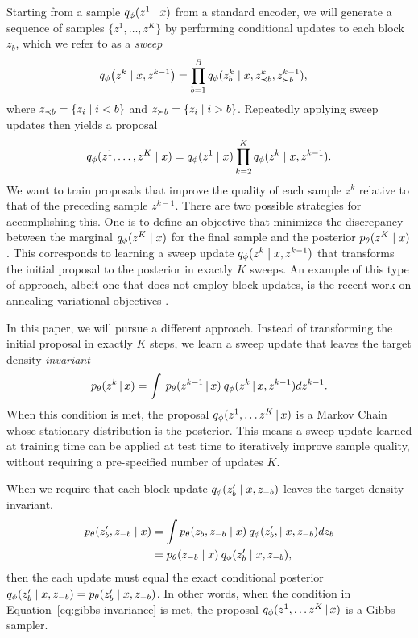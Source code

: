 \documentclass{article}
\theoremstyle{definition}
\begin{document}
Starting from a sample $q_\phi(z^{1} \mid x)$ from a standard encoder, we will generate a sequence of samples $\{z^1, \ldots, z^K\}$ by performing conditional updates to each block $z_b$, which we refer to as a \emph{sweep}
\begin{align}
    \label{eq:approx-gibbs-kernel}
    q_\phi \big( z^k \mid x, z^{k-1} \big)
    &=
    \prod_{b=1}^B
    q_\phi(z^k_b \mid x, z^{k}_{\prec b}, z^{k-1}_{\succ b})
    ,
\end{align}
where $z_{\prec b} = \{z_i \mid i < b\}$ and $z_{\succ b} = \{z_i \mid i > b\}$. Repeatedly applying sweep updates then yields a proposal
\begin{equation*}
    q_\phi(z^1, \ldots, z^K \mid x) 
    =
    q_\phi(z^1 \mid x)
    \prod_{k=2}^K
    q_\phi(z^k \mid x, z^{k-1}).
\end{equation*}
We want to train proposals that improve the quality of each sample $z^k$ relative to that of the preceding sample $z^{k-1}$. There are two possible strategies for accomplishing this. One is to define an objective that minimizes the discrepancy between the marginal $q_\phi(z^K \mid x)$ for the final sample and the posterior $p_\theta(z^K \mid x)$. This corresponds to learning a sweep update $q_\phi(z^k \mid x, z^{k-1})$ that transforms the initial proposal to the posterior in exactly $K$ sweeps. An example of this type of approach, albeit one that does not employ block updates, is the recent work on annealing variational objectives \cite{huang2018improving}.

In this paper, we will pursue a different approach. Instead of transforming the initial proposal in exactly $K$ steps, we learn a sweep update that leaves the target density \emph{invariant}
\begin{equation}
    \label{eq:kernel-invariance}
    p_\theta(z^k \,|\, x) = \int \: p_\theta(z^{k-1} \,|\, x) \: q_\phi(z^k \,|\,x, z^{k-1}) d z^{k-1}.
\end{equation}
When this condition is met, the proposal $q_\phi(z^1, \ldots z^K \,|\, x)$ is a Markov Chain whose stationary distribution is the posterior. 
This means a sweep update learned at training time can be applied at test time to iteratively improve sample quality, without requiring a pre-specified number of updates $K$.

When we require that each block update $q_\phi(z'_b \mid x, z_{-b})$ leaves the target density invariant, 
\begin{align}
    \label{eq:gibbs-invariance}
    p_\theta(z'_b, z_{-b} \mid x)
    &= 
    \int 
    p_\theta(z_b, z_{-b} \mid x) \:
    q_\phi(z'_b, \mid x, z_{-b}) 
    dz_{b}
    \nonumber
    \\
    &= 
    p_\theta(z_{-b} \mid x) \:
    q_\phi(z'_b \mid x, z_{-b}),
\end{align}
then the each update must equal the exact conditional posterior 
$q_\phi(z'_b \mid x, z_{-b}) = p_\theta(z'_b \mid x, z_{-b})$. In other words, when the condition in Equation~\ref{eq:gibbs-invariance} is met, the proposal $q_\phi(z^1, \ldots z^K \,|\, x)$ is a Gibbs sampler.
\end{document}
